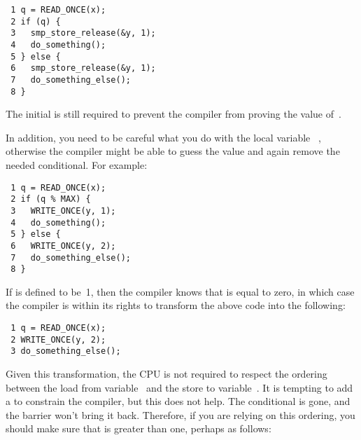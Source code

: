 \vspace{5pt}
\begin{minipage}[t]{\columnwidth}
\scriptsize
\begin{verbatim}
 1 q = READ_ONCE(x);
 2 if (q) {
 3   smp_store_release(&y, 1);
 4   do_something();
 5 } else {
 6   smp_store_release(&y, 1);
 7   do_something_else();
 8 }
\end{verbatim}
\end{minipage}
\vspace{5pt}

The initial  is still required to prevent the compiler from
proving the value of~.

In addition, you need to be careful what you do with the local variable~%
,
otherwise the compiler might be able to guess the value and again remove
the needed conditional.
For example:

\vspace{5pt}
\begin{minipage}[t]{\columnwidth}
\scriptsize
\begin{verbatim}
 1 q = READ_ONCE(x);
 2 if (q % MAX) {
 3   WRITE_ONCE(y, 1);
 4   do_something();
 5 } else {
 6   WRITE_ONCE(y, 2);
 7   do_something_else();
 8 }
\end{verbatim}
\end{minipage}
\vspace{5pt}

If  is defined to be~1, then the compiler knows that  is
equal to zero, in which case the compiler is within its rights to
transform the above code into the following:

\vspace{5pt}
\begin{minipage}[t]{\columnwidth}
\scriptsize
\begin{verbatim}
 1 q = READ_ONCE(x);
 2 WRITE_ONCE(y, 2);
 3 do_something_else();
\end{verbatim}
\end{minipage}
\vspace{5pt}

Given this transformation, the CPU is not required to respect the ordering
between the load from variable~ and the store to variable~.
It is tempting to add a  to constrain the compiler,
but this does not help.
The conditional is gone, and the barrier won't bring it back.
Therefore, if you are relying on this ordering, you should make sure
that  is greater than one, perhaps as follows:

